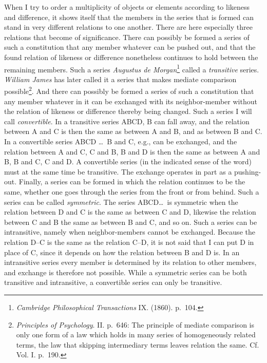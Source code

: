\documentclass[12pt,a4paper]{book}
\newcommand{\opage}[1]{\marginnote{\footnotesize\textit{[#1]}}}
\begin{document}
When I try to order a multiplicity of objects or elements according to
likeness and difference, it shows itself that the members in the series that
is formed can stand in very different relations to one another. There are
here especially three relations that become of significance. There can
possibly be formed a series of such a constitution that any member whatever
can be pushed out, and that the found relation of likeness or difference
nonetheless continues to hold between the remaining members. Such a series
\emph{Augustus de Morgan}\footnote{\emph{Cambridge Philosophical
Transactions} IX. (1860). p.~104.} called a \emph{transitive} series.
\emph{William James} has later called it a series that makes mediate
comparison possible\footnote{\emph{Principles of Psychology}. II. p.~646:
The principle of mediate comparison is only one form of a law which holds in
many series of homogeneously related terms, the law that skipping
intermediary terms leaves relation the same. Cf. Vol. I. p.~190.}. And there
can possibly be formed a series of such a constitution that any member
whatever in it can be exchanged with its neighbor-member without the
relation of likeness or difference thereby being changed. Such a series I
will call \emph{convertible}. In a transitive series ABCD, B can fall away,
and the relation between A and C is then the same as between A and B, and as
between B and C. In a convertible series ABCD \ldots\ B and C, e.g., can be
exchanged, and the relation between A and C, C and B, B and D is then the
same as between A and B, B and C, C and D. A convertible series (in the
indicated sense of the word) must at the same time be transitive. The
exchange operates in part as a pushing-out. Finally, a series can be formed
in which the relation continues to be the same, whether one goes through the
series from the front or from behind. Such a series can be called
\emph{symmetric}. The series ABCD\ldots\ is symmetric when the relation
between D and C is the same as between C and D, likewise the relation between
C and \opage{164}B the same as between B and C, and so on. Such a series can be
intransitive, namely when neighbor-members cannot be exchanged. Because the
relation D--C is the same as the relation C--D, it is not said that I can put
D in place of C, since it depends on how the relation between B and D is. In
an intransitive series every member is determined by its relation to other
members, and exchange is therefore not possible. While a symmetric series
can be both transitive and intransitive, a convertible series can only be
transitive.
\end{document}
